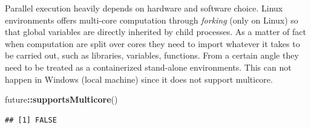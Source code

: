 \documentclass[
  12pt,
  a4paper,
  oneside]{book}
\newenvironment{Shaded}{\begin{snugshade}}{\end{snugshade}}
\newcommand{\KeywordTok}[1]{\textcolor[rgb]{0.13,0.29,0.53}{\textbf{#1}}}
\newcommand{\NormalTok}[1]{#1}
\newcommand{\OperatorTok}[1]{\textcolor[rgb]{0.81,0.36,0.00}{\textbf{#1}}}
\theoremstyle{definition}
\theoremstyle{definition}
\theoremstyle{definition}
\theoremstyle{remark}
\begin{document}
Parallel execution heavily depends on hardware and software choice. Linux environments offers multi-core computation through \emph{forking} \citep{wiki:forking} (only on Linux) so that global variables are directly inherited by child processes. As a matter of fact when computation are split over cores they need to import whatever it takes to be carried out, such as libraries, variables, functions. From a certain angle they need to be treated as a containerized stand-alone environments. This can not happen in Windows (local machine) since it does not support multicore.

\begin{Shaded}
\begin{Highlighting}[]
\NormalTok{future}\OperatorTok{::}\KeywordTok{supportsMulticore}\NormalTok{()}
\end{Highlighting}
\end{Shaded}

\begin{verbatim}
## [1] FALSE
\end{verbatim}
\end{document}
